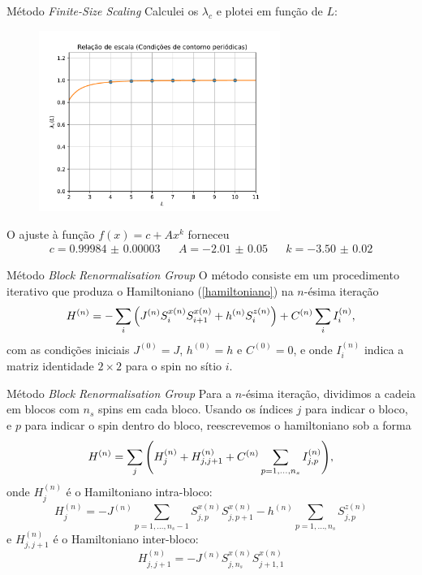 \documentclass[brazil]{beamer}
\begin{document}
\begin{frame}{Método \textit{Finite-Size Scaling}}
    Calculei os \( \lambda_c \) e plotei em função de \( L \):
    \begin{figure}
        \centering
        \includegraphics[width=0.7\textwidth]{rel_escala_ccp.pdf}
    \end{figure}
    O ajuste à função \( f(x) = c + A x^k \) forneceu
    \begin{align*}
        c = \num{0.99984(3)} &  & A = \num{-2.01(5)} &  & k = \num{-3.50(2)}
    \end{align*}
\end{frame}

\begin{frame}{Método \textit{Block Renormalisation Group}}
    O método consiste em um procedimento iterativo que produza o Hamiltoniano (\ref{hamiltoniano}) na \( n \)-ésima iteração
    \begin{equation}
        H^{(n)} = - \sum_i \qty( J^{(n)} S_i^{x (n)} S_{i + 1}^{x (n)} + h^{(n)} S_i^{z (n)} ) + C^{(n)} \sum_i I_i^{(n)} , \label{H_n}
    \end{equation}
    com as condições iniciais \( J^{(0)} = J \), \( h^{(0)} = h \) e \( C^{(0)} = 0 \), e onde \( I_i^{(n)} \) indica a matriz identidade \( 2 \times 2 \) para o spin no sítio \( i \).
\end{frame}

\begin{frame}{Método \textit{Block Renormalisation Group}}
    Para a \( n \)-ésima iteração, dividimos a cadeia em blocos com \( n_s \) spins em cada bloco.
    Usando os índices \( j \) para indicar o bloco, e \( p \) para indicar o spin dentro do bloco, reescrevemos o hamiltoniano sob a forma
    \begin{equation}
        H^{(n)} = \sum_j \qty( H_j^{(n)} + H_{j, j + 1}^{(n)} + C^{(n)} \sum_{p = 1, \dotsc , n_s} I_{j, p}^{(n)} ) , \label{H_j}
    \end{equation}
    onde \( H_j^{(n)} \) é o Hamiltoniano intra-bloco:
    \begin{equation}
        H_j^{(n)} = - J^{(n)} \sum_{p = 1, \dotsc, n_s - 1} S_{j, p}^{x(n)} S_{j, p + 1}^{x(n)} - h^{(n)} \sum_{p = 1, \dotsc, n_s} S_{j, p}^{z(n)}
    \end{equation}
    e \( H_{j, j + 1}^{(n)} \) é o Hamiltoniano inter-bloco:
    \begin{equation}
        H_{j, j + 1}^{(n)} = - J^{(n)} S_{j, n_s}^{x(n)} S_{j + 1, 1}^{x(n)}
    \end{equation}
\end{frame}
\end{document}
